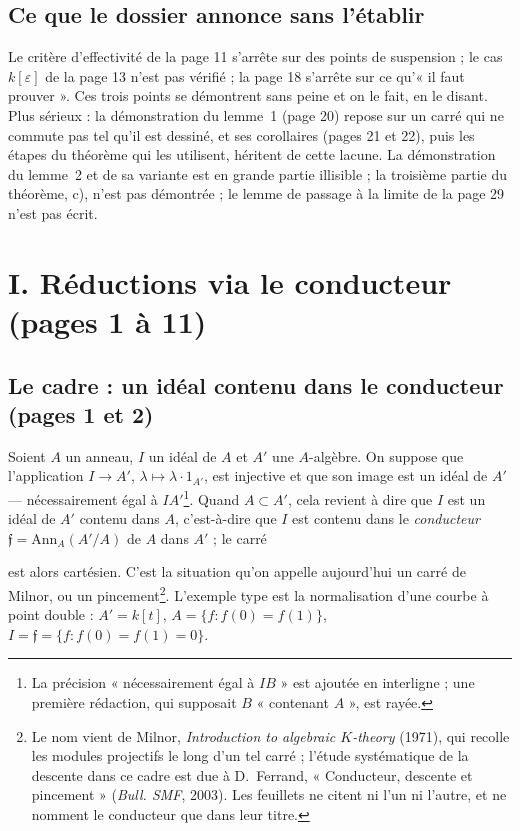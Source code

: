 \documentclass[11pt,a4paper]{article}
\begin{document}
\subsection*{Ce que le dossier annonce sans l'établir}

Le critère d'effectivité de la page 11 s'arrête sur des points de suspension ;
le cas $k[\varepsilon]$ de la page 13 n'est pas vérifié ; la page 18 s'arrête
sur ce qu'« il faut prouver ». Ces trois points se démontrent sans peine et on
le fait, en le disant. Plus sérieux : la démonstration du lemme~1 (page 20)
repose sur un carré qui ne commute pas tel qu'il est dessiné, et ses
corollaires (pages 21 et 22), puis les étapes du théorème qui les utilisent,
héritent de cette lacune. La démonstration du lemme~2 et de sa variante est
en grande partie illisible ; la troisième partie du théorème, c), n'est pas
démontrée ; le lemme de passage à la limite de la page 29 n'est pas écrit.

\section*{I. Réductions via le conducteur (pages 1 à 11)}

\subsection*{Le cadre : un idéal contenu dans le conducteur (pages 1 et 2)}

Soient $A$ un anneau, $I$ un idéal de $A$ et $A'$ une $A$-algèbre. On suppose
que l'application $I \to A'$, $\lambda \mapsto \lambda \cdot 1_{A'}$, est
injective et que son image est un idéal de $A'$ — nécessairement égal à
$IA'$\footnote{La précision « nécessairement égal à $IB$ » est ajoutée en
interligne ; une première rédaction, qui supposait $B$ « contenant $A$ », est
rayée.}. Quand $A \subset A'$, cela revient à dire que $I$ est un idéal de
$A'$ contenu dans $A$, c'est-à-dire que $I$ est contenu dans le
\emph{conducteur} $\mathfrak{f} = \mathrm{Ann}_A(A'/A)$ de $A$ dans $A'$ ; le
carré


est alors cartésien. C'est la situation qu'on appelle aujourd'hui un carré de
Milnor, ou un pincement\footnote{Le nom vient de Milnor, \emph{Introduction
to algebraic $K$-theory} (1971), qui recolle les modules projectifs le long
d'un tel carré ; l'étude systématique de la descente dans ce cadre est due à
D.~Ferrand, « Conducteur, descente et pincement » (\emph{Bull. SMF}, 2003).
Les feuillets ne citent ni l'un ni l'autre, et ne nomment le conducteur que
dans leur titre.}. L'exemple type est la normalisation d'une courbe à point
double : $A' = k[t]$, $A = \{ f : f(0) = f(1) \}$, $I = \mathfrak{f} = \{ f :
f(0) = f(1) = 0 \}$.
\end{document}
